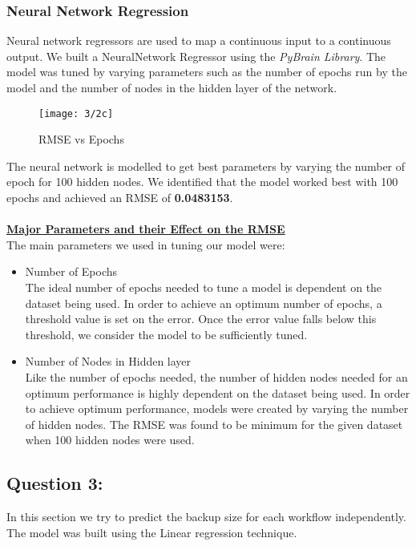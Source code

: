 \documentclass[letterpaper,twocolumn,10pt]{article}
\begin{document}
\subsubsection{Neural Network Regression}
Neural network regressors are used to map a continuous input to a continuous output. We built a NeuralNetwork Regressor using the \emph{PyBrain Library}. The model was tuned by varying parameters such as the number of epochs run by the model and the number of nodes in the hidden layer of the network. \\
\begin{figure}[H]
 \texttt{[image: 3/2c]}
  \caption{RMSE vs Epochs}
  \label{fig:Epochs}
\end{figure}
The neural network is modelled to get best parameters by varying the number of epoch for 100 hidden nodes. We identified that the model worked best with 100 epochs and achieved an RMSE of \textbf{0.0483153}.\\\\
\textbf{\underline{Major Parameters and their Effect on the RMSE}}\\
The main parameters we used in tuning our model were:
\begin{itemize}
\item Number of Epochs\\
The ideal number of epochs needed to tune a model is dependent on the dataset being used. In order to achieve an optimum number of epochs, a threshold value is set on the error. Once the error value falls below this threshold, we consider the model to be sufficiently tuned.
\item Number of Nodes in Hidden layer\\
Like the number of epochs needed, the number of hidden nodes needed for an optimum performance is highly dependent on the dataset being used. In order to achieve optimum performance, models were created by varying the number of hidden nodes. The RMSE was found to be minimum for the given dataset when 100 hidden nodes were used.
\end{itemize}
\subsection{Question 3: }
In this section we try to predict the backup size for each workflow independently. The model was built using the Linear regression technique.
\end{document}
